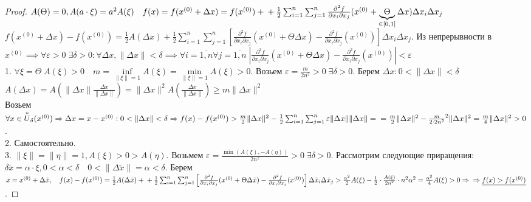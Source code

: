 \documentclass[../main.tex]{subfiles}
\begin{document}
\begin{proof}
    $A(\Theta) = 0, A(a \cdot \xi) = a^{2} A(\xi)\quad f(x) = f(x^{(0)}+\Delta x) = f(x^{(0)})+\\+ \frac{1}{2 }\sum_{i =1}^{n}\sum_{j=1}^{n} \frac{\partial^{2}{f}}{\partial{x_{i}}\partial{x_{j}}}(x^{(0)}+\underbrace{\Theta}_{\in [0,1]} \Delta x) \Delta x_{i}\Delta x_{j}$ 
    \\ $f(x^{(0)}+\Delta x) - f(x^{(0)}) = \frac{1}{2}A(\Delta x)+\frac{1}{2}\sum_{i=1}^{n}\sum_{j=1}^{n} \left[ \frac{\partial^{2}{f}}{\partial{x_{i}}\partial{x_{j}}}(x^{(0)}+\Theta \Delta x) - \frac{\partial^{2}{f}}{\partial{x_{i}}\partial{x_{j}}}(x^{(0)}) \right] \Delta x_{i}\Delta x_{j}$.
    Из непрерывности в $x^{(0)}\implies \forall \varepsilon> 0 \; \exists \delta>0 : \forall \Delta x , \|\Delta x\| < \delta \implies \forall i=\overline{1,n} \forall j =\overline{1,n} \; \left| \frac{\partial^{2}{f}}{\partial{x_{i}}\partial{x_{j}}}(x^{(0)}+\Theta \Delta x) - \frac{\partial^{2}{f}}{\partial{x_{i}}\partial{x_{j}}}(x^{(0)}) \right| < \varepsilon $
    \\1. $\forall \xi = \Theta \; A(\xi)> 0 \quad m = \underset{\|\xi\| = 1}{\inf}{A(\xi)}=\underset{\|\xi\|=1}{\min}{A(\xi)}>0$. Возьем $\varepsilon = \frac{m}{2n^{2}}>0 \; \exists \delta>0$. Берем $\Delta x :0< \|\Delta x\| < \delta $
    $A(\Delta x) = A\left(\|\Delta x\| \frac{\Delta x}{\|\Delta x\|}\right)= \|\Delta x\|^{2} A\left(\frac{\Delta x}{\|\Delta x\|}\right) \geqslant m\|\Delta x\|^{2}$
    \\Возьем $\forall x \in \overset{\circ}{U}_{\delta}(x^{(0)}) \implies \Delta x = x-x^{(0)} : 0< \|\Delta x\| < \delta \implies f(x) - f(x^{(0)}) > \frac{m}{2} \|\Delta x\|^{2} -\frac{1}{2} \sum_{i  =1}^{n  } \sum_{j=1}^{n } \varepsilon \|\Delta x\| \|\Delta x\| =\\= \frac{m}{2} \|\Delta x\|^{2} - \frac{m}{2\cdot 2n^{2}}^{2}\|\Delta x \|^{2} = \frac{m}{4}\|\Delta x\|^{2}> 0$. 
    \\2. Самостоятельно.
    \\3. $\| \xi \| = \| \eta \| = 1, A(\xi)> 0 > A(\eta).$ Возьмем $\varepsilon = \frac{\min{(A(\xi),-A(\eta))}}{2n^{2}}>0\; \exists \delta >0$. Рассмотрим следующие приращения: $\delta \tilde{x} = \alpha \cdot \xi, 0< \alpha < \delta \quad 0<\|\Delta \tilde{x} \| = \alpha <\delta$. Берем $x = x^{(0)} + \Delta \tilde{x},\quad f(x)-f(x^{(0)}) = \frac{1}{2} A (\Delta \tilde{x}) + \\ + \frac{1}{2} \sum_{i=1}^{n}\sum_{j=1}^{n} \left[ \frac{\partial^{2}{f}}{\partial{x_{i}}\partial{x_{j}}}(x^{(0)}+\Theta \Delta \tilde{x}) - \frac{\partial^{2}{f}}{\partial{x_{i}}\partial{x_{j}}}(x^{(0)}) \right] \Delta \tilde{x}_{i}\Delta \tilde{x}_{j} > \frac{\alpha^{2}}{2}A(\xi)- \frac{1}{2} \cdot \frac{A(\xi)}{2n^{2}}\cdot n^{2} \alpha^{2} =\frac{\alpha^{2}}{4} A(\xi) > 0\implies\\ \implies  \underline{f(x) > f(x^{(0)})}$. 

\end{proof}
\end{document}
